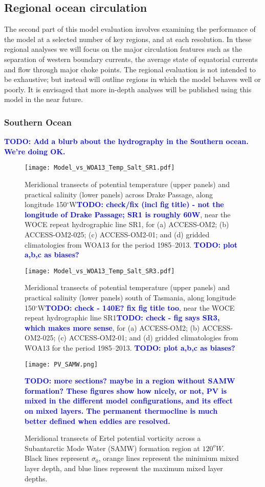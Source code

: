 \documentclass[gmd, manuscript]{copernicus}
\newcommand{\TODO}[1]{\textcolor{blue}{\textsf{\textbf{TODO: #1}}}}
\begin{document}
\subsection{Regional ocean circulation}\label{sec:regional}

The second part of this model evaluation involves examining the performance of  the model at a selected number of key regions, and at each resolution. 
In these regional analyses we will focus on the major circulation features such as the separation of western boundary currents, the average state of equatorial currents and flow through major choke points. 
The regional evaluation is not intended to be exhaustive; but instead will outline regions in which the model behaves well or poorly.
It is envisaged that more in-depth analyses will be published using this model in the near future.


\subsubsection{Southern Ocean}


\TODO{Add a blurb about the hydrography in the Southern ocean. We're doing OK. }
\begin{figure}[t]
\texttt{[image: Model\_vs\_WOA13\_Temp\_Salt\_SR1.pdf]}
\caption{Meridional transects of potential temperature (upper panels) and practical salinity (lower panels) across Drake Passage, along longitude 150$^{\circ}$W\TODO{check/fix (incl fig title) - not the longitude of Drake Passage; SR1 is roughly 60W}, near the WOCE repeat hydrographic line SR1, for (a)  ACCESS-OM2; (b) ACCESS-OM2-025; (c) ACCESS-OM2-01;  and (d) gridded climatologies from WOA13 for the period 1985--2013. 
\TODO{plot a,b,c as biases?}
\label{fig:SR1}}
\end{figure}

\begin{figure}[t]
\texttt{[image: Model\_vs\_WOA13\_Temp\_Salt\_SR3.pdf]}
\caption{Meridional transects of potential temperature (upper panels) and practical salinity (lower panels) south of Tasmania, along longitude 150$^{\circ}$W\TODO{check - 140E? fix fig title too}, near the WOCE repeat hydrographic line SR1\TODO{check - fig says SR3, which makes more sense}, for (a)  ACCESS-OM2; (b) ACCESS-OM2-025; (c) ACCESS-OM2-01;  and (d) gridded climatologies from WOA13 for the period 1985--2013. 
\TODO{plot a,b,c as biases?}
\label{fig:SR3}}
\end{figure}

\begin{figure}[t]
\texttt{[image: PV\_SAMW.png]}
\caption{Meridional transects of Ertel potential vorticity across a Subantarctic Mode Water (SAMW) formation region at $120^oW$. Black lines represent $\sigma_0$, orange lines represent the minimium mixed layer depth, and blue lines represent the maximum mixed layer depths.} 
\TODO{more sections? maybe in a region without SAMW formation? These figures show how nicely, or not, PV is mixed in the different model configurations, and its effect on mixed layers. The permanent thermocline is much better defined when eddies are resolved.}
\label{fig:SR3}
\end{figure}
\end{document}
